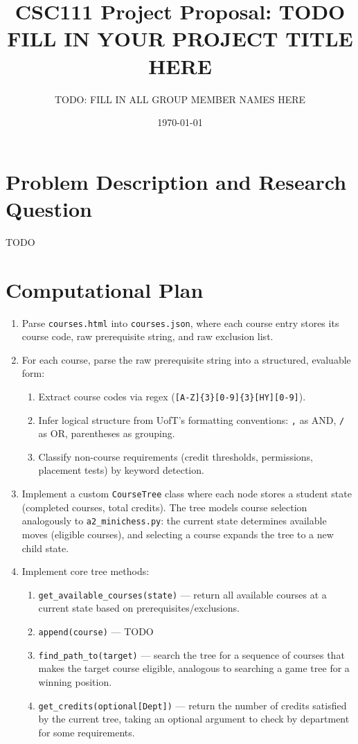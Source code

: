 \documentclass[fontsize=11pt]{article}
\title{CSC111 Project Proposal: TODO FILL IN YOUR PROJECT TITLE HERE}
\author{TODO: FILL IN ALL GROUP MEMBER NAMES HERE}
\date{\today}
\begin{document}
\maketitle

\section*{Problem Description and Research Question}

TODO

\section*{Computational Plan}

\begin{enumerate}
    \item[1.] Parse \verb|courses.html| into \verb|courses.json|, where each course entry stores its course code, raw prerequisite string, and raw exclusion list.

    \item[2.] For each course, parse the raw prerequisite string into a structured, evaluable form:
    \begin{enumerate}
        \item[a)] Extract course codes via regex (\verb|[A-Z]{3}[0-9]{3}[HY][0-9]|).
        \item[b)] Infer logical structure from UofT's formatting conventions: \verb|,| as AND, \verb|/| as OR, parentheses as grouping.
        \item[c)] Classify non-course requirements (credit thresholds, permissions, placement tests) by keyword detection.
    \end{enumerate}

    \item[3.] Implement a custom \verb|CourseTree| class where each node stores a student state (completed courses, total credits). The tree models course selection analogously to \verb|a2_minichess.py|: the current state determines available moves (eligible courses), and selecting a course expands the tree to a new child state.

    \item[4.] Implement core tree methods:
    \begin{enumerate}
        \item[a)] \verb|get_available_courses(state)| --- return all available courses at a current state based on prerequisites/exclusions.
        \item[b)] \verb|append(course)| --- TODO 
        \item[c)] \verb|find_path_to(target)| --- search the tree for a sequence of courses that makes the target course eligible, analogous to searching a game tree for a winning position.
    	\item[d)] \verb|get_credits(optional[Dept])| --- return the number of credits satisfied by the current tree, taking an optional argument to check by department for some requirements.
    \end{enumerate}


\end{enumerate}
\end{document}
